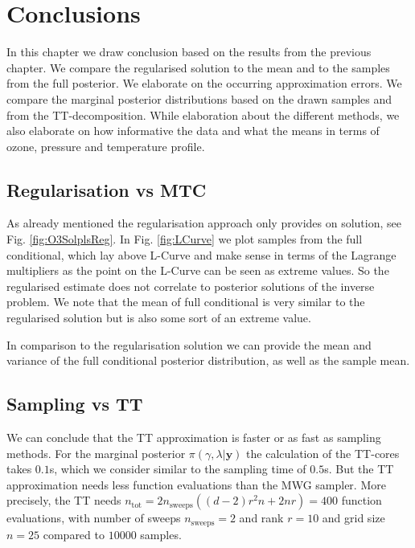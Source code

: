 \chapter{Conclusions}
\label{ch:Concl}
In this chapter we draw conclusion based on the results from the previous chapter.
We compare the regularised solution to the mean and to the samples from the full posterior.
We elaborate on the occurring approximation errors.
We compare the marginal posterior distributions based on the drawn samples and from the TT-decomposition.
While elaboration about the different methods, we also elaborate on how informative the data and what the means in terms of ozone, pressure and temperature profile. 


\section{Regularisation vs MTC}
As already mentioned the regularisation approach only provides on solution, see Fig. \ref{fig:O3SolplsReg}.
In Fig. \ref{fig:LCurve} we plot samples from the full conditional, which lay above L-Curve and make sense in terms of the Lagrange multipliers as the point on the L-Curve can be seen as extreme values.
So the regularised estimate does not correlate to posterior solutions of the inverse problem.
We note that the mean of full conditional is very similar to the regularised solution but is also some sort of an extreme value.

In comparison to the regularisation solution we can provide the mean and variance of the full conditional posterior distribution, as well as the sample mean.



\section{Sampling vs TT}
We can conclude that the TT approximation is faster or as fast as sampling methods.
For the marginal posterior $\pi(\gamma, \lambda | \bm{y})$ the calculation of the TT-cores takes $0.1$s, which we consider similar to the sampling time of $0.5$s.
But the TT approximation needs less function evaluations than the MWG sampler.
More precisely, the TT needs $n_{\text{tot}} = 2n_{\text{sweeps}}((d-2)r^2n+ 2nr) = 400$ function evaluations, with number of sweeps $n_{\text{sweeps}} =2$ and rank $r=10$ and grid size $n = 25$ compared to $10000$ samples.

